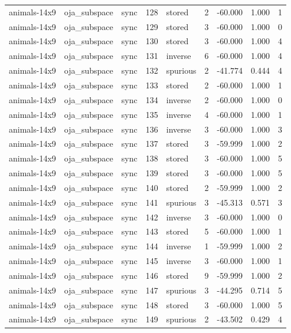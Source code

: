 \begin{tabular}{lllrlrrrr}
animals-14x9 & oja\_subspace & sync & 128 & stored & 2 & -60.000 & 1.000 & 1 \\
animals-14x9 & oja\_subspace & sync & 129 & stored & 3 & -60.000 & 1.000 & 0 \\
animals-14x9 & oja\_subspace & sync & 130 & stored & 3 & -60.000 & 1.000 & 4 \\
animals-14x9 & oja\_subspace & sync & 131 & inverse & 6 & -60.000 & 1.000 & 4 \\
animals-14x9 & oja\_subspace & sync & 132 & spurious & 2 & -41.774 & 0.444 & 4 \\
animals-14x9 & oja\_subspace & sync & 133 & stored & 2 & -60.000 & 1.000 & 1 \\
animals-14x9 & oja\_subspace & sync & 134 & inverse & 2 & -60.000 & 1.000 & 0 \\
animals-14x9 & oja\_subspace & sync & 135 & inverse & 4 & -60.000 & 1.000 & 1 \\
animals-14x9 & oja\_subspace & sync & 136 & inverse & 3 & -60.000 & 1.000 & 3 \\
animals-14x9 & oja\_subspace & sync & 137 & stored & 3 & -59.999 & 1.000 & 2 \\
animals-14x9 & oja\_subspace & sync & 138 & stored & 3 & -60.000 & 1.000 & 5 \\
animals-14x9 & oja\_subspace & sync & 139 & stored & 3 & -60.000 & 1.000 & 5 \\
animals-14x9 & oja\_subspace & sync & 140 & stored & 2 & -59.999 & 1.000 & 2 \\
animals-14x9 & oja\_subspace & sync & 141 & spurious & 3 & -45.313 & 0.571 & 3 \\
animals-14x9 & oja\_subspace & sync & 142 & inverse & 3 & -60.000 & 1.000 & 0 \\
animals-14x9 & oja\_subspace & sync & 143 & stored & 5 & -60.000 & 1.000 & 1 \\
animals-14x9 & oja\_subspace & sync & 144 & inverse & 1 & -59.999 & 1.000 & 2 \\
animals-14x9 & oja\_subspace & sync & 145 & inverse & 3 & -60.000 & 1.000 & 1 \\
animals-14x9 & oja\_subspace & sync & 146 & stored & 9 & -59.999 & 1.000 & 2 \\
animals-14x9 & oja\_subspace & sync & 147 & spurious & 3 & -44.295 & 0.714 & 5 \\
animals-14x9 & oja\_subspace & sync & 148 & stored & 3 & -60.000 & 1.000 & 5 \\
animals-14x9 & oja\_subspace & sync & 149 & spurious & 2 & -43.502 & 0.429 & 4 \\

\end{tabular}
